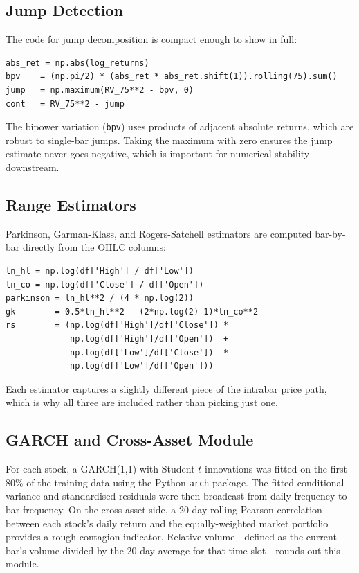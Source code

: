 \subsection{Jump Detection}

The code for jump decomposition is compact enough to show in full:
\begin{verbatim}
abs_ret = np.abs(log_returns)
bpv    = (np.pi/2) * (abs_ret * abs_ret.shift(1)).rolling(75).sum()
jump   = np.maximum(RV_75**2 - bpv, 0)
cont   = RV_75**2 - jump
\end{verbatim}
The bipower variation (\texttt{bpv}) uses products of adjacent absolute returns, which are robust to single-bar jumps. Taking the maximum with zero ensures the jump estimate never goes negative, which is important for numerical stability downstream.

\subsection{Range Estimators}

Parkinson, Garman-Klass, and Rogers-Satchell estimators are computed bar-by-bar directly from the OHLC columns:
\begin{verbatim}
ln_hl = np.log(df['High'] / df['Low'])
ln_co = np.log(df['Close'] / df['Open'])
parkinson = ln_hl**2 / (4 * np.log(2))
gk        = 0.5*ln_hl**2 - (2*np.log(2)-1)*ln_co**2
rs        = (np.log(df['High']/df['Close']) *
             np.log(df['High']/df['Open'])  +
             np.log(df['Low']/df['Close'])  *
             np.log(df['Low']/df['Open']))
\end{verbatim}
Each estimator captures a slightly different piece of the intrabar price path, which is why all three are included rather than picking just one.

\subsection{GARCH and Cross-Asset Module}

For each stock, a GARCH(1,1) with Student-$t$ innovations was fitted on the first 80\% of the training data using the Python \texttt{arch} package. The fitted conditional variance and standardised residuals were then broadcast from daily frequency to bar frequency. On the cross-asset side, a 20-day rolling Pearson correlation between each stock's daily return and the equally-weighted market portfolio provides a rough contagion indicator. Relative volume---defined as the current bar's volume divided by the 20-day average for that time slot---rounds out this module.

